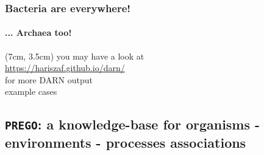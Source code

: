 \documentclass{beamer}
\begin{document}
   \begin{frame}
      \frametitle{Bacteria are everywhere!}
      \framesubtitle{... Archaea too!}


      \begin{textblock*}{6cm}(7cm, 3.5cm)
         you may have a look at \\
         \href{https://hariszaf.github.io/darn/}{https://hariszaf.github.io/darn/} \\
         for more DARN output \\ 
         example cases
      \end{textblock*}

   \end{frame}



   \begin{darkframes}
      \section{
         \texttt{PREGO}: a knowledge-base for organisms - environments - processes associations
      }
   \end{darkframes}
\end{document}

